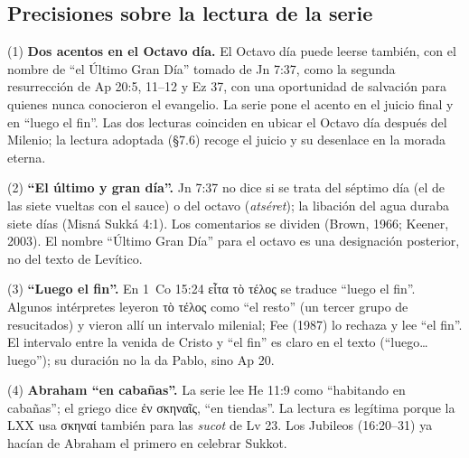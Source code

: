 \documentclass[11pt,letterpaper]{article}
\newcommand{\grc}[1]{\foreignlanguage{ancientgreek}{#1}}
\begin{document}
\subsection{Precisiones sobre la lectura de la serie}
\begin{nota}[Precisión]
(1) \textbf{Dos acentos en el Octavo día.} El Octavo día puede leerse también, con el nombre de ``el Último Gran Día'' tomado de Jn 7:37, como la segunda resurrección de Ap 20:5, 11--12 y Ez 37, con una oportunidad de salvación para quienes nunca conocieron el evangelio. La serie pone el acento en el juicio final y en ``luego el fin''. Las dos lecturas coinciden en ubicar el Octavo día después del Milenio; la lectura adoptada (§7.6) recoge el juicio y su desenlace en la morada eterna.\par
(2) \textbf{``El último y gran día''.} Jn 7:37 no dice si se trata del séptimo día (el de las siete vueltas con el sauce) o del octavo (\emph{atséret}); la libación del agua duraba siete días (Misná Sukká 4:1). Los comentarios se dividen (Brown, 1966; Keener, 2003). El nombre ``Último Gran Día'' para el octavo es una designación posterior, no del texto de Levítico.\par
(3) \textbf{``Luego el fin''.} En 1~Co 15:24 \grc{εἶτα τὸ τέλος} se traduce ``luego el fin''. Algunos intérpretes leyeron \grc{τὸ τέλος} como ``el resto'' (un tercer grupo de resucitados) y vieron allí un intervalo milenial; Fee (1987) lo rechaza y lee ``el fin''. El intervalo entre la venida de Cristo y ``el fin'' es claro en el texto (``luego\ldots{} luego''); su duración no la da Pablo, sino Ap 20.\par
(4) \textbf{Abraham ``en cabañas''.} La serie lee He 11:9 como ``habitando en cabañas''; el griego dice \grc{ἐν σκηναῖς}, ``en tiendas''. La lectura es legítima porque la LXX usa \grc{σκηναί} también para las \emph{sucot} de Lv 23. Los Jubileos (16:20--31) ya hacían de Abraham el primero en celebrar Sukkot.
\end{nota}
\end{document}
